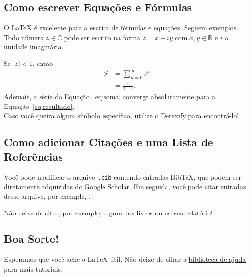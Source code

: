 \documentclass{article}
\begin{document}
\subsection{Como escrever Equações e Fórmulas}

O \LaTeX{} é excelente para a escrita de fórmulas e equações. Seguem exemplos.\\

Todo número $z\in\mathbb{C}$ pode ser escrito na forma $z = x + iy$ com $x,y\in\mathbb{R}$ e $i$ a unidade imaginária.

Se $|z| < 1$, então
\begin{align}
    S &= \sum_{n=0}^{\infty} z^n \label{eq:soma}\\
      &= \frac{1}{1-z}. \label{eq:resultado}
\end{align}
Ademais, a série da Equação~\eqref{eq:soma} converge absolutamente para a Equação~\eqref{eq:resultado}.\\

Caso você queira algum símbolo específico, utilize o \href{https://detexify.kirelabs.org/classify.html}{Detexify} para encontrá-lo!

\subsection{Como adicionar Citações e uma Lista de Referências}

Você pode modificar o arquivo \verb|.bib| contendo entradas BibTeX, que podem ser diretamente adquiridas do \href{https://scholar.google.com/}{Google Scholar}. Em seguida, você pode citar entradas desse arquivo, por exemplo, \cite{greenwade93}.

Não deixe de citar, por exemplo, algum dos livros \cite{stewart} ou \cite{churchill} no seu relatório!

\subsection{Boa Sorte!}

Esperamos que você ache o \LaTeX{} útil.
%
Não deixe de olhar a \href{https://www.overleaf.com/learn}{biblioteca de ajuda} para mais tutoriais.



\end{document}
